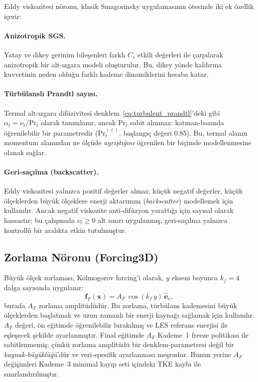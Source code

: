 Eddy viskozitesi nöronu, klasik Smagorinsky uygulamasının ötesinde iki ek özellik içerir:

\paragraph{Anizotropik SGS.} Yatay ve dikey gerinim bileşenleri farklı $C_{s}$ etkili değerleri ile çarpılarak anizotropik bir alt-ızgara modeli oluşturulur. Bu, dikey yönde kaldırma kuvvetinin neden olduğu farklı kademe dinamiklerini hesaba katar.

\paragraph{Türbülanslı Prandtl sayısı.} Termal alt-ızgara difüzivitesi denklem~\eqref{eq:turbulent_prandtl}'deki gibi $\alpha_{t} = \nu_{t}/\mathrm{Pr}_{t}$ olarak tanımlanır, ancak $\mathrm{Pr}_{t}$ sabit alınmaz: katman-bazında öğrenilebilir bir parametredir ($\mathrm{Pr}_{t}^{(\ell)}$, başlangıç değeri $0.85$). Bu, termal alanın momentum alanından ne ölçüde \emph{ayrıştığını} öğrenilen bir biçimde modellenmesine olanak sağlar.

\paragraph{Geri-saçılma (backscatter).} Eddy viskozitesi yalnızca pozitif değerler almaz; küçük negatif değerler, küçük ölçeklerden büyük ölçeklere enerji aktarımını (\textit{backscatter}) modellemek için kullanılır. Ancak negatif viskozite anti-difüzyon yarattığı için sayısal olarak hassastır; bu çalışmada $\nu_{t} \geq 0$ alt sınırı uygulanmış, geri-saçılma yalnızca kontrollü bir aralıkta etkin tutulmuştur.

\subsection{Zorlama Nöronu (Forcing3D)}

Büyük ölçek zorlaması, Kolmogorov forcing'i olarak, $y$ ekseni boyunca $k_{f}=4$ dalga sayısında uygulanır:
\begin{equation}
\mathbf{f}_{F}(\mathbf{x}) = A_{F}\,\cos(k_{f}\,y)\,\hat{\mathbf{e}}_{x},
\label{eq:forcing}
\end{equation}
burada $A_{F}$ zorlama amplitüdüdür. Bu zorlama, türbülans kademesini büyük ölçeklerden başlatmak ve uzun zamanlı bir enerji kaynağı sağlamak için kullanılır. $A_{F}$ değeri, ön eğitimde öğrenilebilir bırakılmış ve LES referans enerjisi ile eşleşecek şekilde ayarlanmıştır. Final eğitimde $A_{F}$ Kademe~1 freeze politikası ile sabitlenmemiş; çünkü zorlama amplitüdü bir denklem-parametresi değil bir \emph{kaynak-büyüklüğü}'dür ve veri-spesifik ayarlanması meşrudur. Bunun yerine $A_{F}$ değişimleri Kademe~3 minimal kayıp seti içindeki TKE kaybı ile sınırlandırılmıştır.

